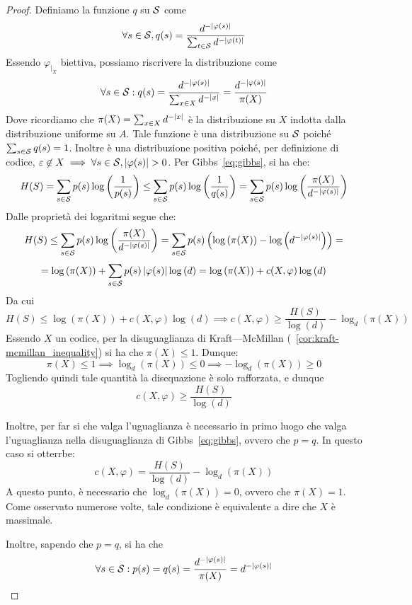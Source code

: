 \begin{proof}
  Definiamo la funzione \(q\) su \(\mathcal{S}\) come
  \[\forall s \in \mathcal{S}, q(s) = \frac{d^{-\left|\varphi(s)\right|}}{\sum_{t \in \mathcal{S}} d^{-\left|\varphi(t)\right|}}\]
  Essendo \(\varphi_{|_X}\) biettiva, possiamo riscrivere la distribuzione come
  \[\forall s \in \mathcal{S}: q(s) = \frac{d^{-\left|\varphi(s)\right|}}{\sum_{x\in X} d^{-\left|x\right|}} = \frac{d^{-\left|\varphi(s)\right|}}{\pi(X)}\]
  Dove ricordiamo che \(\pi(X) = \sum_{x\in X} d^{-\left|x\right|}\) è la distribuzione su \(X\) indotta dalla distribuzione uniforme su \(A\).
  Tale funzione è una distribuzione su \(\mathcal{S}\) poiché \(\sum_{s\in\mathcal{S}}q(s) = 1\). Inoltre è una distribuzione positiva poiché, per definizione di codice, \(\varepsilon \not\in X \implies \forall s \in \mathcal{S}, \left|\varphi(s)\right| > 0\).
  Per Gibbs~\eqref{eq:gibbs}, si ha che:
  \[H(S) = \sum_{s \in \mathcal{S}} p(s)\log\left(\frac{1}{p(s)}\right) \leq \sum_{s \in \mathcal{S}} p(s) \log\left(\frac{1}{q(s)}\right) = \sum_{s \in \mathcal{S}} p(s) \log\left(\frac{\pi(X)}{d^{-\left|\varphi(s)\right|}}\right)\]
  Dalle proprietà dei logaritmi segue che:
  \[H(S)\leq \sum_{s \in \mathcal{S}} p(s) \log\left(\frac{\pi(X)}{d^{-\left|\varphi(s)\right|}}\right)= \sum_{s \in \mathcal{S}}p(s)\left(\log\left(\pi(X)\right)-\log\left(d^{-\left|\varphi(s)\right|}\right)\right) = \]
  \[=\log\left(\pi(X)\right) + \sum_{s \in \mathcal{S}}p(s)\left|\varphi(s)\right|\log\left(d\right) = \log\left(\pi(X)\right) + c(X,\varphi)\log\left(d\right)\]
  Da cui
  \[H(S) \leq \log\left(\pi(X)\right) + c(X,\varphi)\log\left(d\right) \implies c(X,\varphi) \geq \frac{H(S)}{\log\left(d\right)} - \log_{d}(\pi(X))\]
  Essendo \(X\) un codice, per la disuguaglianza di Kraft---McMillan (~\ref{cor:kraft-mcmillan_inequality}) si ha che \(\pi(X) \leq 1\).
  Dunque:
  \[\pi(X)\leq 1 \implies \log_{d}(\pi(X)) \leq 0 \implies -\log_{d}(\pi(X)) \geq 0\]
  Togliendo quindi tale quantità la disequazione è solo rafforzata, e dunque
  \[c(X,\varphi) \geq \frac{H(S)}{\log\left(d\right)}\]

  Inoltre, per far si che valga l'uguaglianza è necessario in primo luogo che valga l'uguaglianza nella disuguaglianza di Gibbs~\eqref{eq:gibbs}, ovvero che \(p = q\).
  In questo caso si otterrbe:
  \[c(X,\varphi) = \frac{H(S)}{\log\left(d\right)} - \log_{d}(\pi(X))\]
  A questo punto, è necessario che \(\log_{d}(\pi(X)) = 0\), ovvero che \(\pi(X) = 1\). Come osservato numerose volte, tale condizione è equivalente a dire che \(X\) è massimale.

  Inoltre, sapendo che \(p = q\), si ha che
  \[\forall s \in \mathcal{S}: p(s) = q(s) = \frac{d^{-\left|\varphi(s)\right|}}{\pi(X)} = d^{-\left|\varphi(s)\right|}\]


\end{proof}

